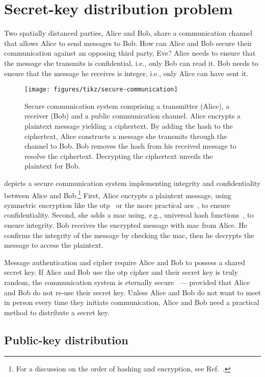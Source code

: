 \section{Secret-key distribution problem}

Two spatially distanced parties, Alice and Bob, share a communication channel that allows Alice to send messages to Bob.
How can Alice and Bob secure their communication against an opposing third party, Eve?
Alice needs to ensure that the message she transmits is confidential, i.e., only Bob can read it.
Bob needs to ensure that the message he receives is integer, i.e., only Alice can have sent it.
\begin{figure}[htb]
	\centering
	\texttt{[image: figures/tikz/secure-communication]}
	\caption{Secure communication system comprising a transmitter (Alice), a receiver (Bob) and a public communication channel. Alice encrypts a plaintext message yielding a ciphertext. By adding the hash to the ciphertext, Alice constructs a message she transmits through the channel to Bob. Bob removes the hash from his received message to resolve the ciphertext. Decrypting the ciphertext unveils the plaintext for Bob.}\label{fig:secure_communication}
\end{figure}
 depicts a secure communication system implementing integrity and confidentiality between Alice and Bob.\footnote{For a discussion on the order of hashing and encryption, see Ref.~\cite{Kohno2003,Krawczyk2001,Bellare2000}.}
First, Alice encrypts a plaintext message, using symmetric encryption like the \gls{otp}~\cite{Shannon1949} or the more practical \gls{aes}~\cite{Daemen1999}, to ensure confidentiality.
Second, she adds a \gls{mac} using, e.g., universal hash functions~\cite{Carter1979}, to ensure integrity.
Bob receives the encrypted message with \gls{mac} from Alice.
He confirms the integrity of the message by checking the \gls{mac}, then he decrypts the message to access the plaintext.

Message authentication and cipher require Alice and Bob to possess a shared secret key.
If Alice and Bob use the \gls{otp} cipher and their secret key is truly random, the communication system is eternally secure~\cite{Shannon1949} --- provided that Alice and Bob do not re-use their secret key.
Unless Alice and Bob do not want to meet in person every time they initiate communication, Alice and Bob need a practical method to distribute a secret key.

\subsection{Public-key distribution}

